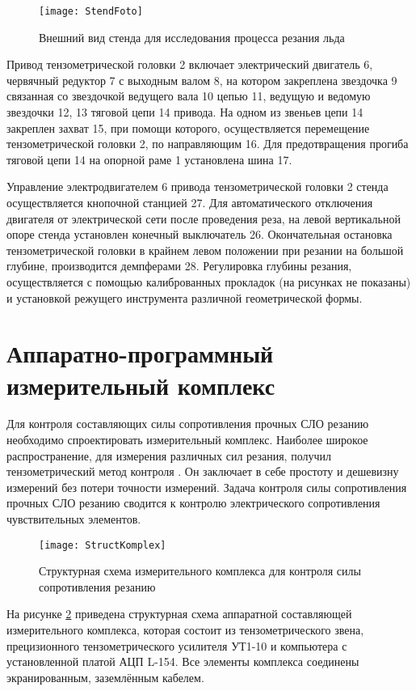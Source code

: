 \begin{figure} [h]
	\center
	\texttt{[image: StendFoto]}
	\caption{Внешний вид стенда для исследования процесса резания льда} 
	\label{img:StendFoto}  
\end{figure}

Привод тензометрической головки 2 включает электрический двигатель 6, червячный редуктор 7 с выходным валом 8, на котором закреплена звездочка 9 связанная со звездочкой ведущего вала 10 цепью 11, ведущую и ведомую звездочки 12, 13 тяговой цепи 14 привода. На одном из звеньев цепи 14 закреплен захват 15, при помощи которого, осуществляется перемещение тензометрической головки 2, по направляющим 16. Для предотвращения прогиба тяговой цепи 14 на опорной раме 1 установлена шина 17.

Управление электродвигателем 6 привода тензометрической головки 2 стенда осуществляется кнопочной станцией 27. Для автоматического отключения двигателя от электрической сети после проведения реза, на левой вертикальной опоре стенда установлен конечный выключатель 26. Окончательная остановка тензометрической головки в крайнем левом положении при резании на большой глубине, производится демпферами 28. Регулировка глубины резания, осуществляется с помощью калиброванных прокладок (на рисунках не показаны) и установкой режущего инструмента различной геометрической формы.

\section{Аппаратно-программный измерительный комплекс}\label{sect2_4}

Для контроля составляющих силы сопротивления прочных СЛО резанию необходимо спроектировать измерительный комплекс. Наиболее широкое распространение, для измерения различных сил резания, получил тензометрический метод контроля \todo{[ссылки]}. Он заключает в себе простоту и дешевизну измерений без потери точности измерений. Задача контроля силы сопротивления прочных СЛО резанию сводится к контролю электрического сопротивления чувствительных элементов.

\begin{figure} [htbp]
	\center
	\texttt{[image: StructKomplex]}
	\caption{Структурная схема измерительного комплекса для контроля силы сопротивления резанию} 
	\label{img:StructKomplex}  
\end{figure}

На рисунке \ref{img:StructKomplex} приведена структурная схема аппаратной составляющей измерительного комплекса, которая состоит из тензометрического звена, прецизионного тензометрического усилителя УТ1-10 и компьютера с установленной платой АЦП L-154. Все элементы комплекса соединены экранированным, заземлённым кабелем.

